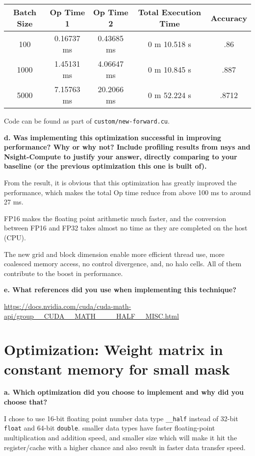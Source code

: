 \documentclass[12pt]{article}
\begin{document}
\begin{table}[!ht]
\begin{longtable}{c|cccc} \toprule
Batch Size & Op Time 1 & Op Time 2 & Total Execution Time & Accuracy \\ \midrule
100  & 0.16737 ms & 0.43685 ms & 0 m 10.518 s & .86 \\
1000 & 1.45131 ms & 4.06647 ms & 0 m 10.845 s & .887 \\
5000 & 7.15763 ms & 20.2066 ms & 0 m 52.224 s & .8712 \\
\bottomrule
\end{longtable}
\end{table}

Code can be found as part of \texttt{custom/new-forward.cu}.

\hfill \break
\noindent \textbf{d. \; Was implementing this optimization successful in improving performance? Why or why not? Include profiling results from nsys and Nsight-Compute to justify your answer, directly comparing to your baseline (or the previous optimization this one is built of).}
\hfill \break

From the result, it is obvious that this optimization has greatly improved the performance, which makes the total Op time reduce from above 100 ms to around 27 ms.

FP16 makes the floating point arithmetic much faster, and the conversion between FP16 and FP32 takes almost no time as they are completed on the host (CPU).

The new grid and block dimension enable more efficient thread use, more coalesced memory access, no control divergence, and, no halo cells. All of them contribute to the boost in performance.

\hfill \break
\noindent \textbf{e. \; What references did you use when implementing this technique?}
\hfill \break

\url{https://docs.nvidia.com/cuda/cuda-math-api/group__CUDA__MATH____HALF__MISC.html}
\hfill \break

\section{Optimization: Weight matrix in constant memory for small mask}

\hfill\break
\noindent \textbf{a. \; Which optimization did you choose to implement and why did you choose that?}
\hfill\break

I chose to use 16-bit floating point number data type \texttt{\_\_half} instead of 32-bit \texttt{float} and 64-bit \texttt{double}. smaller data types have faster floating-point multiplication and addition speed, and smaller size which will make it hit the register/cache with a higher chance and also result in faster data transfer speed.
\end{document}
